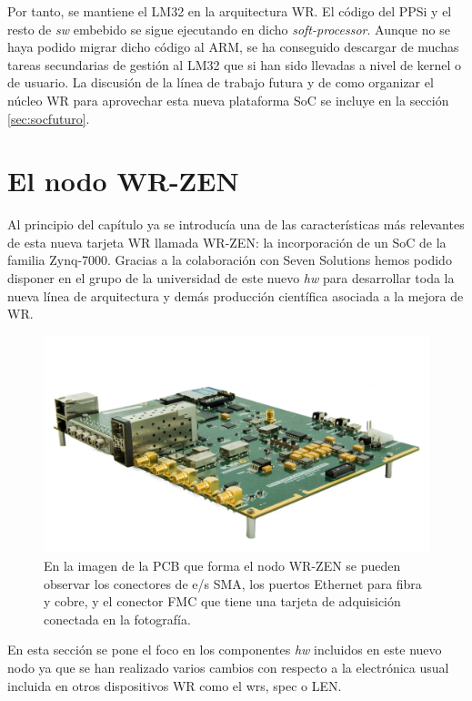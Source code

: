 Por tanto, se mantiene el LM32 en la arquitectura WR. El código del PPSi y el 
resto de \textit{sw} embebido se sigue ejecutando en dicho 
\textit{soft-processor}. Aunque no se haya podido migrar dicho código al ARM, 
se ha conseguido descargar de muchas tareas secundarias de gestión al LM32 que 
si han sido llevadas a nivel de kernel o de usuario. La discusión de la línea 
de trabajo futura y de como organizar el núcleo WR para aprovechar esta nueva 
plataforma SoC se incluye en la sección \ref{sec:socfuturo}.

\section{El nodo WR-ZEN}

Al principio del capítulo ya se introducía una de las características más 
relevantes de esta nueva tarjeta WR llamada WR-ZEN: la incorporación de un SoC 
de la familia Zynq-7000. Gracias a la colaboración con Seven Solutions hemos 
podido disponer en el grupo de la universidad de este nuevo \textit{hw} para 
desarrollar toda la nueva línea de arquitectura y demás producción científica 
asociada a la mejora de WR.

\begin{figure}
	\centering
	\includegraphics[width=0.7\linewidth]{imagenes/wrzen}
	\caption[Foto de la tarjeta WR-ZEN]{En la imagen de la PCB que forma el 
	nodo WR-ZEN se pueden observar los conectores de e/s SMA, los puertos 
	Ethernet para fibra y cobre, y el conector FMC que tiene una tarjeta de 
	adquisición conectada en la fotografía.}
	\label{fig:wrzen}
\end{figure}

En esta sección se pone el foco en los componentes \textit{hw} incluidos en 
este nuevo nodo ya que se han realizado varios cambios con respecto a la 
electrónica usual incluida en otros dispositivos WR como el \gls{wrs}, 
\gls{spec} o LEN.


